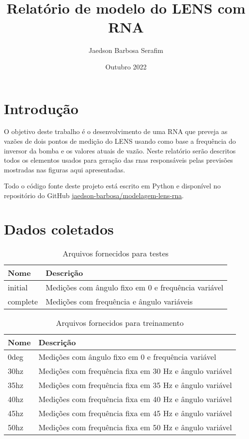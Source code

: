 \documentclass[12pt]{article}
\title{Relatório de modelo do LENS com RNA}
\author{Jaedson Barbosa Serafim}
\date{Outubro 2022}
\begin{document}
\maketitle

\section{Introdução}

O objetivo deste trabalho é o desenvolvimento de uma RNA que preveja as vazões de dois pontos de medição do LENS usando como base a frequência do inversor da bomba e os valores atuais de vazão.
Neste relatório serão descritos todos os elementos usados para geração das \acrshort{rna}s responsáveis pelas previsões mostradas nas figuras aqui apresentadas.

Todo o código fonte deste projeto está escrito em Python e disponível no repositório do GitHub 
\href{https://github.com/jaedson-barbosa/modelagem-lens-rna}{jaedson-barbosa/modelagem-lens-rna}.

\section{Dados coletados}

\begin{table}
\caption{Arquivos fornecidos para testes}
\centering
\begin{tabular}{|l|l|} 
\hline
Nome & Descrição \\ 
\hline
initial & Medições com ângulo fixo em 0 e frequência variável \\ 
\hline
complete & Medições com frequência e ângulo variáveis \\
\hline
\end{tabular}
\label{tab:arquivos_testes}
\end{table}

\begin{table}
\caption{Arquivos fornecidos para treinamento}
\centering
\begin{tabular}{|l|l|} 
\hline
Nome & Descrição \\ 
\hline
0deg & Medições com ângulo fixo em 0 e frequência variável \\ 
\hline
30hz & Medições com frequência fixa em 30 Hz e ângulo variável \\ 
\hline
35hz & Medições com frequência fixa em 35 Hz e ângulo variável \\ 
\hline
40hz & Medições com frequência fixa em 40 Hz e ângulo variável \\ 
\hline
45hz & Medições com frequência fixa em 45 Hz e ângulo variável \\ 
\hline
50hz & Medições com frequência fixa em 50 Hz e ângulo variável \\
\hline
\end{tabular}
\label{tab:arquivos_treinamento}
\end{table}
\end{document}
